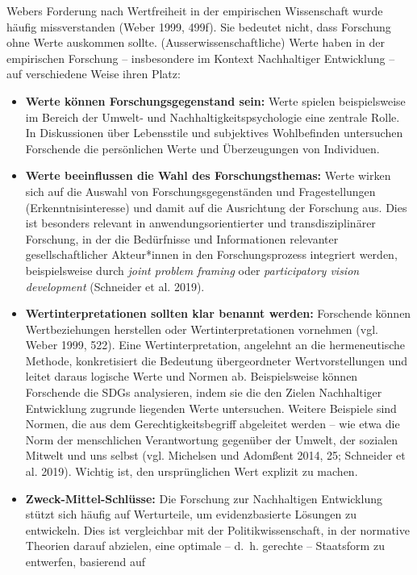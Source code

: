 \documentclass[
  nswissgerman,
  a4paper,
  DIV=11,
  numbers=noendperiod,
  oneside,
  openany]{scrreprt}
\begin{document}
Webers Forderung nach Wertfreiheit in der empirischen Wissenschaft wurde
häufig missverstanden (Weber 1999, 499f). Sie bedeutet nicht, dass
Forschung ohne Werte auskommen sollte. (Ausserwissenschaftliche) Werte
haben in der empirischen Forschung -- insbesondere im Kontext
Nachhaltiger Entwicklung -- auf verschiedene Weise ihren Platz:

\begin{itemize}
\item
  \textbf{Werte können Forschungsgegenstand sein:} Werte spielen
  beispielsweise im Bereich der Umwelt- und Nachhaltigkeitspsychologie
  eine zentrale Rolle. In Diskussionen über Lebensstile und subjektives
  Wohlbefinden untersuchen Forschende die persönlichen Werte und
  Überzeugungen von Individuen.
\item
  \textbf{Werte beeinflussen die Wahl des Forschungsthemas:} Werte
  wirken sich auf die Auswahl von Forschungsgegenständen und
  Fragestellungen (Erkenntnisinteresse) und damit auf die Ausrichtung
  der Forschung aus. Dies ist besonders relevant in
  anwendungsorientierter und transdisziplinärer Forschung, in der die
  Bedürfnisse und Informationen relevanter gesellschaftlicher
  Akteur*innen in den Forschungsprozess integriert werden,
  beispielsweise durch \emph{joint problem framing} oder
  \emph{participatory vision development} (Schneider et al. 2019).
\item
  \textbf{Wertinterpretationen sollten klar benannt werden:} Forschende
  können Wertbeziehungen herstellen oder Wertinterpretationen vornehmen
  (vgl. Weber 1999, 522). Eine Wertinterpretation, angelehnt an die
  hermeneutische Methode, konkretisiert die Bedeutung übergeordneter
  Wertvorstellungen und leitet daraus logische Werte und Normen ab.
  Beispielsweise können Forschende die SDGs analysieren, indem sie die
  den Zielen Nachhaltiger Entwicklung zugrunde liegenden Werte
  untersuchen. Weitere Beispiele sind Normen, die aus dem
  Gerechtigkeitsbegriff abgeleitet werden -- wie etwa die Norm der
  menschlichen Verantwortung gegenüber der Umwelt, der sozialen Mitwelt
  und uns selbst (vgl. Michelsen und Adomßent 2014, 25; Schneider et al.
  2019). Wichtig ist, den ursprünglichen Wert explizit zu machen.
\item
  \textbf{Zweck-Mittel-Schlüsse:} Die Forschung zur Nachhaltigen
  Entwicklung stützt sich häufig auf Werturteile, um evidenzbasierte
  Lösungen zu entwickeln. Dies ist vergleichbar mit der
  Politikwissenschaft, in der normative Theorien darauf abzielen, eine
  optimale -- d.~h. gerechte -- Staatsform zu entwerfen, basierend auf

\end{itemize}
\end{document}
